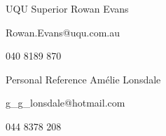 


\begin{cventries}


\cventry
{UQU Superior} %
{Rowan Evans} %
{} %
{} %
{ %
\begin{cvitems}
\item Rowan.Evans@uqu.com.au
\item 040 8189 870
\end{cvitems}
}


\cventry
{Personal Reference} %
{Amélie Lonsdale} %
{} %
{} %
{ %
\begin{cvitems}
\item g\_g\_lonsdale@hotmail.com
\item 044 8378 208
\end{cvitems}
}


\end{cventries}